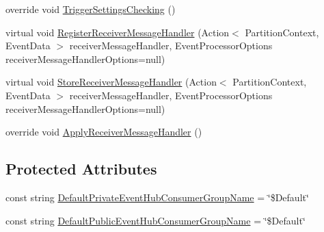 \begin{DoxyCompactItemize}
\item 
override void \hyperlink{classCqrs_1_1Azure_1_1ServiceBus_1_1AzureEventHub_a779ce1115cf00dfaf072056a6ad8f9fe}{Trigger\+Settings\+Checking} ()
\item 
virtual void \hyperlink{classCqrs_1_1Azure_1_1ServiceBus_1_1AzureEventHub_afbea0e107f3d4e8f8d4f2215ff2f7787}{Register\+Receiver\+Message\+Handler} (Action$<$ Partition\+Context, Event\+Data $>$ receiver\+Message\+Handler, Event\+Processor\+Options receiver\+Message\+Handler\+Options=null)
\item 
virtual void \hyperlink{classCqrs_1_1Azure_1_1ServiceBus_1_1AzureEventHub_a5924517b1e88c09e3c0c1aec9c737a8d}{Store\+Receiver\+Message\+Handler} (Action$<$ Partition\+Context, Event\+Data $>$ receiver\+Message\+Handler, Event\+Processor\+Options receiver\+Message\+Handler\+Options=null)
\item 
override void \hyperlink{classCqrs_1_1Azure_1_1ServiceBus_1_1AzureEventHub_af2efc497815828b6fe0b4d6621bc8b41}{Apply\+Receiver\+Message\+Handler} ()
\end{DoxyCompactItemize}
\subsection*{Protected Attributes}
\begin{DoxyCompactItemize}
\item 
const string \hyperlink{classCqrs_1_1Azure_1_1ServiceBus_1_1AzureEventHub_a523df6f08c43b3ca013c08555098f4ad}{Default\+Private\+Event\+Hub\+Consumer\+Group\+Name} = \char`\"{}\$Default\char`\"{}
\item 
const string \hyperlink{classCqrs_1_1Azure_1_1ServiceBus_1_1AzureEventHub_a71191dfe0cccbbc59c37cadf051a5cdd}{Default\+Public\+Event\+Hub\+Consumer\+Group\+Name} = \char`\"{}\$Default\char`\"{}
\end{DoxyCompactItemize}
